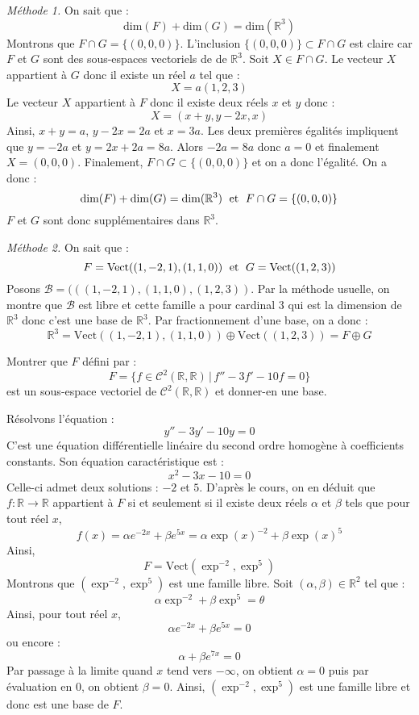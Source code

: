 \documentclass[a4paper,10pt]{report}
\begin{document}
\medskip

\noindent \textit{Méthode 1.} On sait que :
$$ \textrm{dim}(F) + \textrm{dim}(G) = \textrm{dim}(\mathbb{R}^3)$$
Montrons que $F \cap G = \lbrace (0,0,0) \rbrace$. L'inclusion $ \lbrace (0,0,0) \rbrace \subset F \cap G$ est claire car $F$ et $G$ sont des sous-espaces vectoriels de de $\mathbb{R}^3$. Soit $X \in F \cap G$. Le vecteur $X$ appartient à $G$ donc il existe un réel $a$ tel que :
$$ X = a(1,2,3)$$
Le vecteur $X$ appartient à $F$ donc il existe deux réels $x$ et $y$ donc :
$$ X = (x+y,y-2x,x)$$
Ainsi, $x+y=a$, $y-2x=2a$ et $x=3a$. Les deux premières égalités impliquent que $y=-2a$ et $y=2x+2a=8a$. Alors $-2a=8a$ donc $a=0$ et finalement $X=(0,0,0)$. Finalement, $F \cap G \subset \lbrace (0,0,0) \rbrace$ et on a donc l'égalité. On a donc :
$$  \textrm{dim}(F) + \textrm{dim}(G) = \textrm{dim}(\mathbb{R}^3) \; \hbox{ et } \; F \cap G = \lbrace (0,0,0) \rbrace$$
$F$ et $G$ sont donc supplémentaires dans $\mathbb{R}^3$.

\medskip

\noindent \textit{Méthode 2.} On sait que :
$$ F=\textrm{Vect}((1,-2,1),(1,1,0)) \; \hbox{ et } \; G=\textrm{Vect}((1,2,3))$$
Posons $\mathcal{B}=(((1,-2,1),(1,1,0),(1,2,3))$. Par la méthode usuelle, on montre que $\mathcal{B}$ est libre et cette famille a pour cardinal $3$ qui est la dimension de $\mathbb{R}^3$ donc c'est une base de $\mathbb{R}^3$. Par fractionnement d'une base, on a donc :
$$ \mathbb{R}^3 =  \textrm{Vect}((1,-2,1),(1,1,0)) \oplus \textrm{Vect}((1,2,3)) = F \oplus G$$

\begin{Exercice}{} Montrer que $F$ défini par :
$$ F=\lbrace f \in \mathcal{C}^2(\mathbb{R}, \mathbb{R}) \, \vert \,  f''-3f'-10f= 0 \rbrace $$
est un sous-espace vectoriel de $\mathcal{C}^2(\mathbb{R}, \mathbb{R})$ et donner-en une base.
\end{Exercice} 

\corr Résolvons l'équation :
$$ y''-3y'-10y = 0$$
C'est une équation différentielle linéaire du second ordre homogène à coefficients constants. Son équation caractéristique est :
$$ x^2-3x-10=0$$
Celle-ci admet deux solutions : $-2$ et $5$. D'après le cours, on en déduit que $f : \mathbb{R} \rightarrow \mathbb{R}$ appartient à $F$ si et seulement si il existe deux réels $\alpha$ et $\beta$ tels que pour tout réel $x$,
$$ f(x) = \alpha e^{-2x} + \beta e^{5x} = \alpha \exp(x)^{-2} + \beta \exp(x)^5$$
Ainsi,
$$ F = \textrm{Vect}(\exp^{-2}, \exp^5)$$
Montrons que $(\exp^{-2}, \exp^5)$ est une famille libre. Soit $(\alpha, \beta) \in \mathbb{R}^2$ tel que :
$$ \alpha \exp^{-2} + \beta \exp^5 = \theta$$
Ainsi, pour tout réel $x$,
$$ \alpha e^{-2x} + \beta e^{5x} = 0$$
ou encore :
$$ \alpha  + \beta e^{7x} = 0$$
Par passage à la limite quand $x$ tend vers $- \infty$, on obtient $\alpha=0$ puis par évaluation en $0$, on obtient $\beta =0$. Ainsi, $(\exp^{-2}, \exp^5)$ est une famille libre et donc est une base de $F$.
\end{document}
